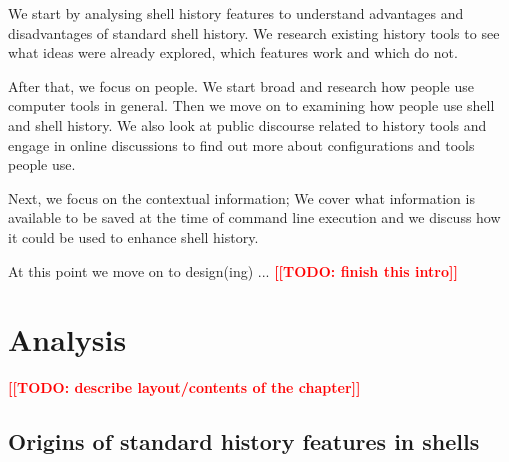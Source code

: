 \documentclass[thesis=M,english]{FITthesis}[2012/10/20]
\newcommand{\todotext}[1]{\textcolor{red}{\textbf{[[#1]]}}}
\newcommand{\blind}[1][1]{\textcolor{mygray}{\Blindtext[#1][1]}}
\begin{document}
\begin{introduction}


 We start by analysing shell history features to understand advantages and disadvantages of standard shell history. We research existing history tools to see what ideas were already explored, which features work and which do not. 

After that, we focus on people. We start broad and research how people use computer tools in general. Then we move on to examining how people use shell and shell history. We also look at public discourse related to history tools and engage in online discussions to find out more about configurations and tools people use.

Next, we focus on the contextual information; We cover what information is available to be saved at the time of command line execution and we discuss how it could be used to enhance shell history. 

At this point we move on to design(ing) ...
\todotext{TODO: finish this intro}


\blind[2]

\end{introduction}


\chapter{Analysis}



\todotext{TODO: describe layout/contents of the chapter}

\blind

\section{Origins of standard history features in shells}
\end{document}
